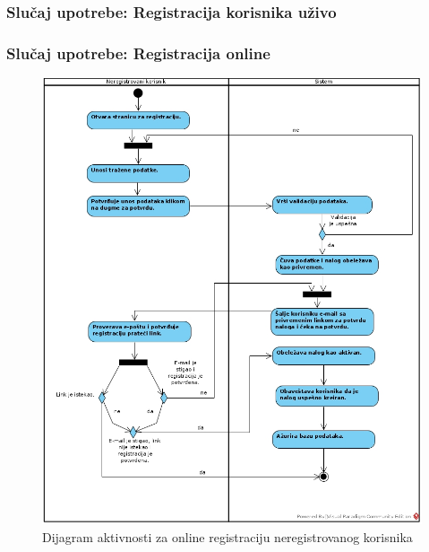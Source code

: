 \documentclass[a4paper]{article}
\begin{document}
\subsubsection{Slučaj upotrebe: Registracija korisnika uživo}


\subsubsection{Slučaj upotrebe: Registracija online}

\newpage
\begin{figure}[!ht]
\begin{center}
\includegraphics[scale=0.50]{sections/images/dijagram_aktivnosti_registracija_neregistrovanog_korisnika_online.jpg}
\end{center}
\caption{Dijagram aktivnosti za online registraciju neregistrovanog korisnika}
\label{fig:kontekst}
\end{figure}


\newpage
\end{document}
